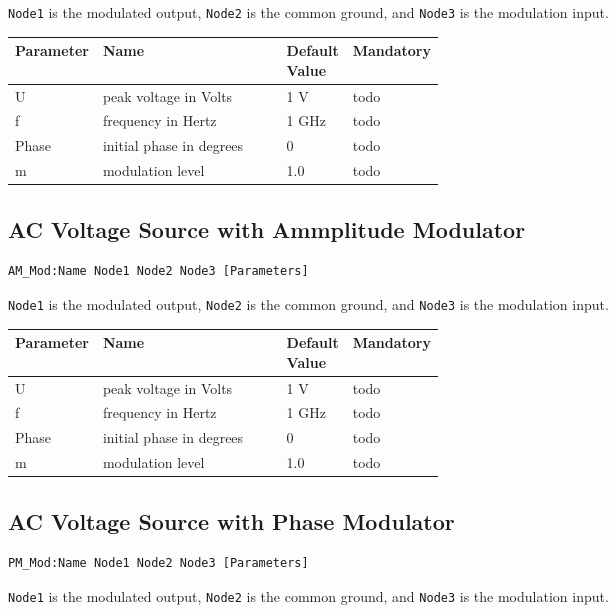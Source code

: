 \verb+Node1+ is the modulated output, \verb+Node2+ is the common ground, and \verb+Node3+ is the modulation input.

\begin{tabular}{|l|p{0.5\linewidth}|l|l|}
\hline
Parameter & Name & Default Value & Mandatory \\
\hline
U & peak voltage in Volts & 1 V & todo \\
f & frequency in Hertz & 1 GHz & todo \\
Phase & initial phase in degrees & 0 & todo \\
m & modulation level & 1.0 & todo \\
\hline
\end{tabular}



\subsection{AC Voltage Source with Ammplitude Modulator}

\begin{verbatim}
AM_Mod:Name Node1 Node2 Node3 [Parameters]
\end{verbatim}

\verb+Node1+ is the modulated output, \verb+Node2+ is the common ground, and \verb+Node3+ is the modulation input.

\begin{tabular}{|l|p{0.5\linewidth}|l|l|}
\hline
Parameter & Name & Default Value & Mandatory \\
\hline
U & peak voltage in Volts & 1 V & todo \\
f & frequency in Hertz & 1 GHz & todo \\
Phase & initial phase in degrees & 0 & todo \\
m & modulation level & 1.0 & todo \\
\hline
\end{tabular}



\subsection{AC Voltage Source with Phase Modulator}

\begin{verbatim}
PM_Mod:Name Node1 Node2 Node3 [Parameters]
\end{verbatim}

\verb+Node1+ is the modulated output, \verb+Node2+ is the common ground, and \verb+Node3+ is the modulation input.


